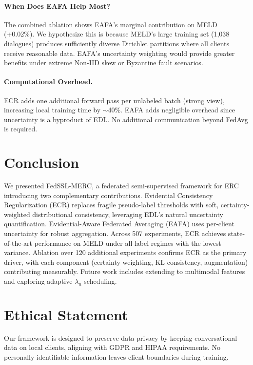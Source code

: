 \documentclass[letterpaper]{article}
\newcommand{\method}{FedSSL-MERC}
\begin{document}
\paragraph{When Does EAFA Help Most?}
The combined ablation shows EAFA's marginal contribution on MELD (+0.02\%).
We hypothesize this is because MELD's large training set (1,038 dialogues)
produces sufficiently diverse Dirichlet partitions where all clients receive
reasonable data. EAFA's uncertainty weighting would provide greater benefits
under extreme Non-IID skew or Byzantine fault scenarios.

\paragraph{Computational Overhead.}
ECR adds one additional forward pass per unlabeled batch (strong view), increasing
local training time by ${\sim}$40\%. EAFA adds negligible overhead since uncertainty
is a byproduct of EDL. No additional communication beyond FedAvg is required.

\section{Conclusion}

We presented \method{}, a federated semi-supervised framework for ERC introducing
two complementary contributions. Evidential Consistency Regularization (ECR)
replaces fragile pseudo-label thresholds with soft, certainty-weighted
distributional consistency, leveraging EDL's natural uncertainty quantification.
Evidential-Aware Federated Averaging (EAFA) uses per-client uncertainty for
robust aggregation. Across 507 experiments, ECR achieves state-of-the-art
performance on MELD under all label regimes with the lowest variance. Ablation
over 120 additional experiments confirms ECR as the primary driver, with each
component (certainty weighting, KL consistency, augmentation) contributing
measurably. Future work includes extending to multimodal features and exploring
adaptive $\lambda_u$ scheduling.

\section*{Ethical Statement}
Our framework is designed to preserve data privacy by keeping conversational
data on local clients, aligning with GDPR and HIPAA requirements. No personally
identifiable information leaves client boundaries during training.


\end{document}
